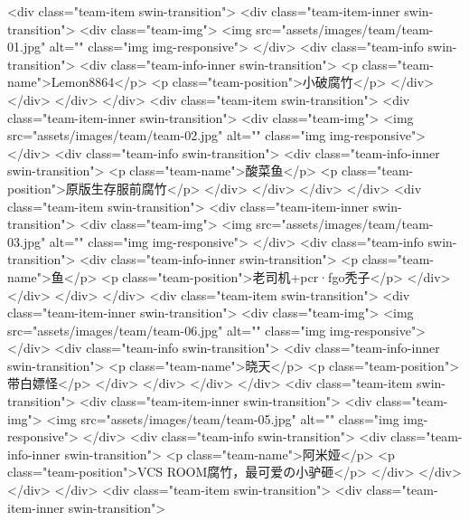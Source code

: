       <div class="team-item swin-transition"> 
       <div class="team-item-inner swin-transition"> 
        <div class="team-img">
         <img src="assets/images/team/team-01.jpg" alt="" class="img img-responsive">
        </div> 
        <div class="team-info swin-transition"> 
         <div class="team-info-inner swin-transition"> 
          <p class="team-name">Lemon8864</p> 
          <p class="team-position">小破腐竹</p> 
         </div> 
        </div> 
       </div> 
      </div> 
      <div class="team-item swin-transition"> 
       <div class="team-item-inner swin-transition"> 
        <div class="team-img">
         <img src="assets/images/team/team-02.jpg" alt="" class="img img-responsive">
        </div> 
        <div class="team-info swin-transition"> 
         <div class="team-info-inner swin-transition"> 
          <p class="team-name">酸菜鱼</p> 
          <p class="team-position">原版生存服前腐竹</p> 
         </div> 
        </div> 
       </div> 
      </div> 
      <div class="team-item swin-transition"> 
       <div class="team-item-inner swin-transition"> 
        <div class="team-img">
         <img src="assets/images/team/team-03.jpg" alt="" class="img img-responsive">
        </div> 
        <div class="team-info swin-transition"> 
         <div class="team-info-inner swin-transition"> 
          <p class="team-name">鱼</p> 
          <p class="team-position">老司机+pcr·fgo秃子</p> 
         </div> 
        </div> 
       </div> 
      </div> 
      <div class="team-item swin-transition"> 
       <div class="team-item-inner swin-transition"> 
        <div class="team-img">
         <img src="assets/images/team/team-06.jpg" alt="" class="img img-responsive">
        </div> 
        <div class="team-info swin-transition"> 
         <div class="team-info-inner swin-transition"> 
          <p class="team-name">晓天</p> 
          <p class="team-position">带白嫖怪</p> 
         </div> 
        </div> 
       </div> 
      </div> 
      <div class="team-item swin-transition"> 
       <div class="team-item-inner swin-transition"> 
        <div class="team-img">
         <img src="assets/images/team/team-05.jpg" alt="" class="img img-responsive">
        </div> 
        <div class="team-info swin-transition"> 
         <div class="team-info-inner swin-transition"> 
          <p class="team-name">阿米娅</p> 
          <p class="team-position">VCS ROOM腐竹，最可爱の小驴砸</p> 
         </div> 
        </div> 
       </div> 
      </div> 
      <div class="team-item swin-transition"> 
       <div class="team-item-inner swin-transition"> 
